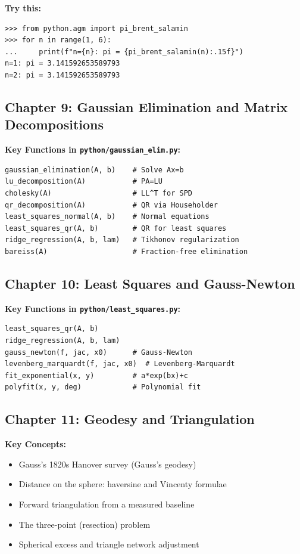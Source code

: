 \documentclass[11pt,a4paper]{article}
\begin{document}
\textbf{Try this:}
\begin{lstlisting}[style=python]
>>> from python.agm import pi_brent_salamin
>>> for n in range(1, 6):
...     print(f"n={n}: pi = {pi_brent_salamin(n):.15f}")
n=1: pi = 3.141592653589793
n=2: pi = 3.141592653589793
\end{lstlisting}

\subsection{Chapter 9: Gaussian Elimination and Matrix Decompositions}

\textbf{Key Functions in \texttt{python/gaussian\_elim.py}:}
\begin{lstlisting}[style=python]
gaussian_elimination(A, b)    # Solve Ax=b
lu_decomposition(A)           # PA=LU
cholesky(A)                   # LL^T for SPD
qr_decomposition(A)           # QR via Householder
least_squares_normal(A, b)    # Normal equations
least_squares_qr(A, b)        # QR for least squares
ridge_regression(A, b, lam)   # Tikhonov regularization
bareiss(A)                    # Fraction-free elimination
\end{lstlisting}

\subsection{Chapter 10: Least Squares and Gauss-Newton}

\textbf{Key Functions in \texttt{python/least\_squares.py}:}
\begin{lstlisting}[style=python]
least_squares_qr(A, b)
ridge_regression(A, b, lam)
gauss_newton(f, jac, x0)      # Gauss-Newton
levenberg_marquardt(f, jac, x0)  # Levenberg-Marquardt
fit_exponential(x, y)         # a*exp(bx)+c
polyfit(x, y, deg)            # Polynomial fit
\end{lstlisting}

\subsection{Chapter 11: Geodesy and Triangulation}

\textbf{Key Concepts:}
\begin{itemize}
    \item Gauss's 1820s Hanover survey (Gauss's geodesy)
    \item Distance on the sphere: haversine and Vincenty formulae
    \item Forward triangulation from a measured baseline
    \item The three-point (resection) problem
    \item Spherical excess and triangle network adjustment
\end{itemize}
\end{document}
